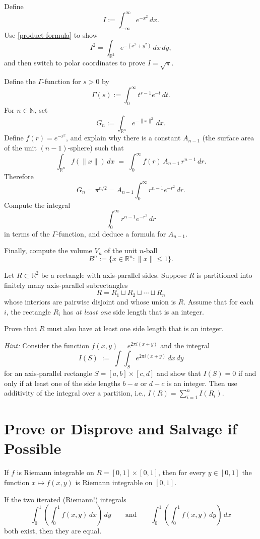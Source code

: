\documentclass{homework}
\begin{document}
\begin{problem}
Define
\[
I := \int_{-\infty}^{\infty} e^{-x^2}\,dx.
\]
Use \ref{product-formula} to show
\[I^2
=
\int_{\mathbb{R}^2} e^{-(x^2+y^2)}\,dx\,dy,
\]
and then switch to polar coordinates to prove $I = \sqrt{\pi}$.
\end{problem}

\begin{problem}
Define the $\Gamma$-function for $s>0$ by
\[
\Gamma(s):=\int_{0}^{\infty} t^{s-1}e^{-t}\,dt.
\]
For $n\in\mathbb{N}$, set
\[
G_n := \int_{\mathbb{R}^n} e^{-\|x\|^2}\,dx.
\]
Define $f(r) = e^{-r^2}$, and 
explain why there is a constant $A_{n-1}$ (the surface area of the unit
$(n-1)$-sphere) such that 
  \[
  \int_{\mathbb{R}^n} f(\|x\|)\,dx \;=\; \int_{0}^{\infty} f(r)\,A_{n-1}\,r^{n-1}\,dr.
  \]
Therefore
  \[
  G_n = \pi^{n/2} = A_{n-1}\int_{0}^{\infty} r^{n-1}e^{-r^2}\,dr.
  \]
Compute the integral
  \[
  \int_{0}^{\infty} r^{n-1}e^{-r^2}\,dr
  \]
  in terms of the $\Gamma$-function, and deduce a formula for
  $A_{n-1}$.

Finally, compute the volume $V_n$ of the unit $n$-ball
  \[
  B^n := \{x\in\mathbb{R}^n : \|x\|\le 1\}.
  \]
\end{problem}



\begin{problem}
Let $R\subset \mathbb{R}^2$ be a rectangle with axis-parallel sides. Suppose $R$ is partitioned into finitely many axis-parallel subrectangles
\[
R = R_1 \sqcup R_2 \sqcup \cdots \sqcup R_n
\]
whose interiors are pairwise disjoint and whose union is $R$. Assume that for each $i$, the rectangle $R_i$ has \emph{at least one} side length that is an integer.

Prove that $R$ must also have at least one side length that is an integer.

\textit{Hint:} Consider the function $f(x,y)=e^{2\pi i(x+y)}$ and the integral
\[
I(S) \;:=\; \int\!\!\int_{S} e^{2\pi i(x+y)}\,dx\,dy
\]
for an axis-parallel rectangle $S=[a,b]\times[c,d]$ and 
show that $I(S)=0$ if and only if at least one of the side lengths $b-a$ or $d-c$ is an integer.
Then use additivity of the integral over a partition, i.e., \(I(R)=\sum_{i=1}^n I(R_i)\).
\end{problem}

\section{Prove or Disprove and Salvage if Possible}

\begin{problem}\label{fubini-no-hypotheses}%
  If $f$ is Riemann integrable on $R=[0,1]\times[0,1]$, then for every $y\in[0,1]$ the function
  $x\mapsto f(x,y)$ is Riemann integrable on $[0,1]$.
\end{problem}

\begin{problem}\label{swap-always}%
  If the two iterated (Riemann!) integrals
  \[
    \int_0^1\left(\int_0^1 f(x,y)\,dx\right)\,dy
    \qquad\text{and}\qquad
    \int_0^1\left(\int_0^1 f(x,y)\,dy\right)\,dx
  \]
  both exist, then they are equal.
\end{problem}
\end{document}
